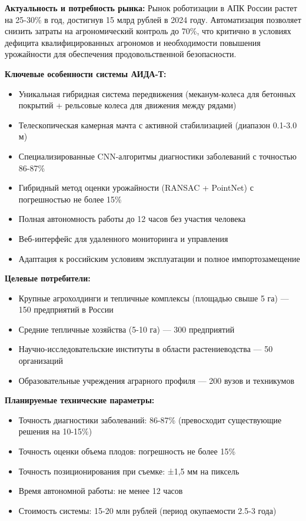 \documentclass[12pt,a4paper]{article}
\begin{document}
\textbf{Актуальность и потребность рынка:}
Рынок роботизации в АПК России растет на 25-30\% в год, достигнув 15 млрд рублей в 2024 году. Автоматизация позволяет снизить затраты на агрономический контроль до 70\%, что критично в условиях дефицита квалифицированных агрономов и необходимости повышения урожайности для обеспечения продовольственной безопасности.

\textbf{Ключевые особенности системы АИДА-Т:}
\begin{itemize}
    \item Уникальная гибридная система передвижения (меканум-колеса для бетонных покрытий + рельсовые колеса для движения между рядами)
    \item Телескопическая камерная мачта с активной стабилизацией (диапазон 0.1-3.0 м)
    \item Специализированные CNN-алгоритмы диагностики заболеваний с точностью 86-87\%
    \item Гибридный метод оценки урожайности (RANSAC + PointNet) с погрешностью не более 15\%
    \item Полная автономность работы до 12 часов без участия человека
    \item Веб-интерфейс для удаленного мониторинга и управления
    \item Адаптация к российским условиям эксплуатации и полное импортозамещение
\end{itemize}

\textbf{Целевые потребители:}
\begin{itemize}
    \item Крупные агрохолдинги и тепличные комплексы (площадью свыше 5 га) — 150 предприятий в России
    \item Средние тепличные хозяйства (5-10 га) — 300 предприятий
    \item Научно-исследовательские институты в области растениеводства — 50 организаций
    \item Образовательные учреждения аграрного профиля — 200 вузов и техникумов
\end{itemize}

\textbf{Планируемые технические параметры:}
\begin{itemize}
    \item Точность диагностики заболеваний: 86-87\% (превосходит существующие решения на 10-15\%)
    \item Точность оценки объема плодов: погрешность не более 15\%
    \item Точность позиционирования при съемке: ±1,5 мм на пиксель
    \item Время автономной работы: не менее 12 часов
    \item Стоимость системы: 15-20 млн рублей (период окупаемости 2.5-3 года)
\end{itemize}
\end{document}
